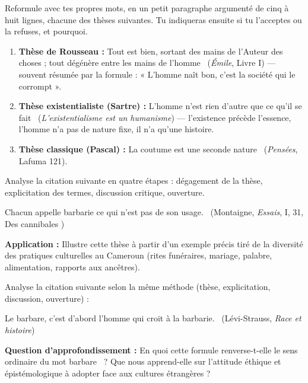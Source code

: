 \documentclass[11pt]{article}
\newcounter{popsec}
\newcounter{popsub}
\newcommand{\courssub}[1]{%
  \stepcounter{popsub}%
  \par\vspace{9pt}\noindent{\popxbold\fontsize{11.5}{13}\selectfont\color{popink}{\color{poporange}\thepopsec.\thepopsub}\hspace{6pt}#1}\par\nopagebreak\vspace{4pt}
}
\begin{document}
\courssub{Je m'entraîne}

\begin{exercice}
Reformule avec tes propres mots, en un petit paragraphe argumenté de cinq à huit lignes, chacune des thèses suivantes. Tu indiqueras ensuite si tu l'acceptes ou la refuses, et pourquoi.

\begin{enumerate}
\item \textbf{Thèse de Rousseau :} \guillemotleft Tout est bien, sortant des mains de l'Auteur des choses ; tout dégénère entre les mains de l'homme \guillemotright\ (\emph{Émile}, Livre I) — souvent résumée par la formule : « L'homme naît bon, c'est la société qui le corrompt ».
\item \textbf{Thèse existentialiste (Sartre) :} \guillemotleft L'homme n'est rien d'autre que ce qu'il se fait \guillemotright\ (\emph{L'existentialisme est un humanisme}) — l'existence précède l'essence, l'homme n'a pas de nature fixe, il n'a qu'une histoire.
\item \textbf{Thèse classique (Pascal) :} \guillemotleft La coutume est une seconde nature \guillemotright\ (\emph{Pensées}, Lafuma 121).
\end{enumerate}
\end{exercice}

\begin{exercice}
Analyse la citation suivante en quatre étapes : dégagement de la thèse, explicitation des termes, discussion critique, ouverture.

\guillemotleft Chacun appelle barbarie ce qui n'est pas de son usage. \guillemotright\ (Montaigne, \emph{Essais}, I, 31, \guillemotleft Des cannibales \guillemotright)

\textbf{Application :} Illustre cette thèse à partir d'un exemple précis tiré de la diversité des pratiques culturelles au Cameroun (rites funéraires, mariage, palabre, alimentation, rapports aux ancêtres).
\end{exercice}

\begin{exercice}
Analyse la citation suivante selon la même méthode (thèse, explicitation, discussion, ouverture) :

\guillemotleft Le barbare, c'est d'abord l'homme qui croit à la barbarie. \guillemotright\ (Lévi-Strauss, \emph{Race et histoire})

\textbf{Question d'approfondissement :} En quoi cette formule renverse-t-elle le sens ordinaire du mot \guillemotleft barbare \guillemotright\ ? Que nous apprend-elle sur l'attitude éthique et épistémologique à adopter face aux cultures étrangères ?
\end{exercice}
\end{document}

